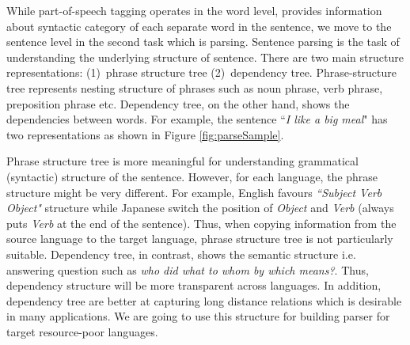 \documentclass[12pt,twoside,final,hidelinks]{ltthesis}
\theoremstyle{definition}
\begin{document}
While part-of-speech tagging  operates in the word level, provides information about syntactic category of each separate word in the sentence, we move to the sentence level in the second task which is parsing. Sentence parsing is the task of understanding the underlying structure of sentence. There are two main structure representations: (1)~phrase structure tree (2)~dependency tree. Phrase-structure tree represents nesting structure of phrases such as noun phrase, verb phrase, preposition phrase etc. Dependency tree, on the other hand, shows the dependencies between words. For example, the sentence ``\textit{I like a big meal}" has two representations as shown in Figure \ref{fig:parseSample}.

Phrase structure tree is more meaningful for understanding grammatical (syntactic) structure of the sentence. However, for each language, the phrase structure might be very different. For example, English favours \textit{``Subject Verb Object"} structure while Japanese switch the position of \textit{Object} and \textit{Verb} (always puts \textit{Verb} at the end of the sentence). Thus, when copying information from the source language to the target language, phrase structure tree is not particularly suitable. Dependency tree, in contrast, shows the semantic structure i.e. answering question such as \textit{who did what to whom by which means?}. Thus, dependency structure will be more transparent across languages. In addition, dependency tree are better at capturing long distance relations which is desirable in many applications.  
We are going to use this structure for building parser for target resource-poor languages.
\end{document}
